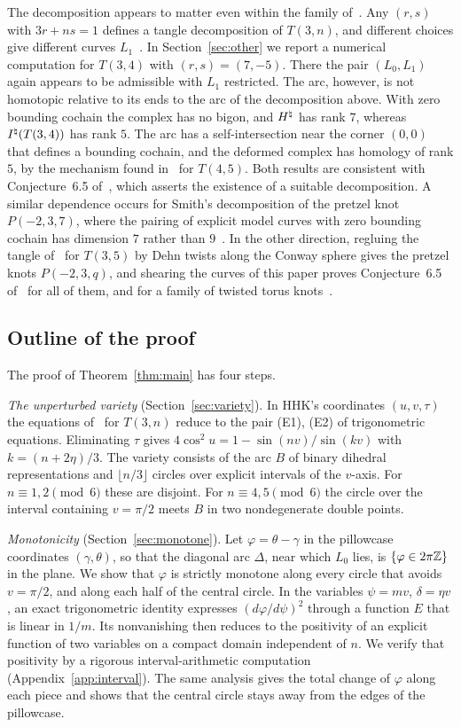 The decomposition appears to matter even within the family of~\cite[\S10]{HHK2}. Any $(r,s)$ with $3r+ns=1$ defines a
tangle decomposition of $T(3,n)$, and different choices give different curves $L_1$~\cite[\S11]{HHK2}.
In Section~\ref{sec:other} we report a numerical computation for $T(3,4)$ with $(r,s)=(7,-5)$. There the pair
$(L_0,L_1)$ again appears to be admissible with $L_1$ restricted. The arc, however, is not homotopic relative to
its ends to the arc of the decomposition above. With zero bounding cochain the complex has no bigon, and $H^{\natural}$
has rank $7$, whereas $I^{\natural}(T(3,4))$ has rank $5$. The arc has a self-intersection near the corner $(0,0)$
that defines a bounding cochain, and the deformed complex has homology of rank $5$, by the mechanism
found in~\cite[\S10.3]{CHKK} for $T(4,5)$. Both results are consistent with Conjecture~6.5 of~\cite{HHK2},
which asserts the existence of a suitable decomposition. A similar dependence occurs for Smith's decomposition of
the pretzel knot $P(-2,3,7)$, where the pairing of explicit model curves with zero bounding cochain has dimension $7$
rather than $9$~\cite[Prop.~3.7]{WuebbenIIb}. In the other direction, regluing the tangle of~\cite[\S10]{HHK2} for
$T(3,5)$ by Dehn twists along the Conway sphere gives the pretzel knots $P(-2,3,q)$, and shearing the curves of
this paper proves Conjecture~6.5 of~\cite{HHK2} for all of them, and for a family of twisted torus
knots~\cite[\S\S4--5]{WuebbenII}.

\subsection*{Outline of the proof}
The proof of Theorem~\ref{thm:main} has four steps.

\emph{The unperturbed variety} (Section~\ref{sec:variety}). In HHK's coordinates $(u,v,\tau)$ the equations
of~\cite[\S10]{HHK2} for $T(3,n)$ reduce to the pair (E1), (E2) of trigonometric equations. Eliminating $\tau$
gives $4\cos^2u=1-\sin(nv)/\sin(kv)$ with $k=(n+2\eta)/3$. The variety consists of the arc $B$ of binary dihedral
representations and $\lfloor n/3\rfloor$ circles over explicit intervals of the $v$-axis. For
$n\equiv1,2\pmod6$ these are disjoint. For $n\equiv4,5\pmod6$ the circle over the interval containing
$v=\pi/2$ meets $B$ in two nondegenerate double points.

\emph{Monotonicity} (Section~\ref{sec:monotone}). Let $\varphi=\theta-\gamma$ in the pillowcase coordinates
$(\gamma,\theta)$, so that the diagonal arc $\Delta$, near which $L_0$ lies, is $\{\varphi\in2\pi\mathbb{Z}\}$ in the
plane. We show that $\varphi$ is strictly monotone along every circle that avoids $v=\pi/2$, and along each
half of the central circle. In the variables $\psi=mv$, $\delta=\eta v$, an exact trigonometric identity
expresses $(d\varphi/d\psi)^2$ through a function $E$ that is linear in $1/m$. Its nonvanishing then reduces to
the positivity of an explicit function of two variables on a compact domain independent of $n$. We
verify that positivity by a rigorous interval-arithmetic computation (Appendix~\ref{app:interval}). The same
analysis gives the total change of $\varphi$ along each piece and shows that the central circle stays away
from the edges of the pillowcase.

